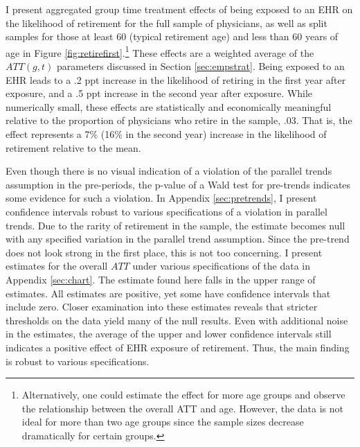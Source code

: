 \documentclass[12pt]{article}
\begin{document}
I present aggregated group time treatment effects of being exposed to an EHR on the likelihood of retirement for the full sample of physicians, as well as split samples for those at least 60 (typical retirement age) and less than 60 years of age in Figure \ref{fig:retirefirst}.\footnote{Alternatively, one could estimate the effect for more age groups and observe the relationship between the overall ATT and age. However, the data is not ideal for more than two age groups since the sample sizes decrease dramatically for certain groups.} These effects are a weighted average of the $ATT(g,t)$ parameters discussed in Section \ref{sec:empstrat}. Being exposed to an EHR leads to a .2 ppt increase in the likelihood of retiring in the first year after exposure, and a .5 ppt increase in the second year after exposure. While numerically small, these effects are statistically and economically meaningful relative to the proportion of physicians who retire in the sample, .03. That is, the effect represents a 7\% (16\% in the second year) increase in the likelihood of retirement relative to the mean. 

Even though there is no visual indication of a violation of the parallel trends assumption in the pre-periods, the p-value of a Wald test for pre-trends indicates some evidence for such a violation. In Appendix \ref{sec:pretrends}, I present confidence intervals robust to various specifications of a violation in parallel trends. Due to the rarity of retirement in the sample, the estimate becomes null with any specified variation in the parallel trend assumption. Since the pre-trend does not look strong in the first place, this is not too concerning. I present estimates for the overall $ATT$ under various specifications of the data in Appendix \ref{sec:chart}. The estimate found here falls in the upper range of estimates. All estimates are positive, yet some have confidence intervals that include zero. Closer examination into these estimates reveals that stricter thresholds on the data yield many of the null results. Even with additional noise in the estimates, the average of the upper and lower confidence intervals still indicates a positive effect of EHR exposure of retirement. Thus, the main finding is robust to various specifications.   
\end{document}
